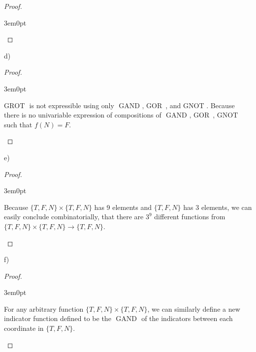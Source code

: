 \documentclass[11pt]{article}
\newcommand{\gor}{\mbox{ GOR }}
\newcommand{\gand}{\mbox{ GAND }}
\newcommand{\gnot}{\mbox{GNOT }}
\newcommand{\grot}{\mbox{GROT }}
\newenvironment{myproof}
{\begin{proof} \begin{adjustwidth}{3em}{0pt}$ $\par\nobreak\ignorespaces}
{\end{adjustwidth} \end{proof}}
\begin{document}
\begin{flushleft}
\begin{myproof}
\end{myproof}

d)

\begin{myproof}

$\grot$ is not expressible using only $\gand, \gor$, and $\gnot$. Because there is no univariable expression of compositions of $\gand, \gor$, $\gnot$ such that $f(N) = F$.

\end{myproof}

e)

\begin{myproof}

Because $\{T,F,N \} \times \{T, F, N\}$ has 9 elements and $\{ T, F, N \}$ has 3 elements, we can easily conclude combinatorially, that there are $3^9$ different functions from $\{T,F,N \} \times \{T, F, N\} \to \{ T,F,N \}$.

\end{myproof}

f)

\begin{myproof}

For any arbitrary function $\{T,F,N \} \times \{T, F, N\}$, we can similarly define a new indicator function defined to be the $\gand$ of the indicators between each coordinate in $\{ T,F,N \}$.

\end{myproof}


\end{flushleft}
\end{document}
